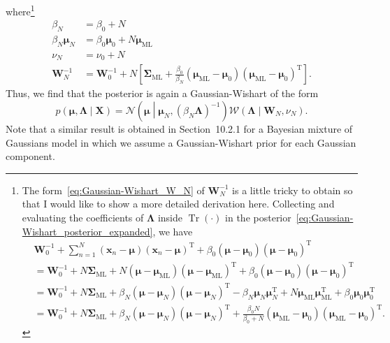 \documentclass[12pt,a4paper]{article}
\begin{document}
where\footnote{%
The form~\eqref{eq:Gaussian-Wishart_W_N} of $\mathbf{W}_N^{-1}$ is a little tricky to obtain
so that I would like to show a more detailed derivation here.
Collecting and evaluating the coefficients of $\bm{\Lambda}$ inside $\operatorname{Tr}(\cdot)$
in the posterior~\eqref{eq:Gaussian-Wishart_posterior_expanded},
we have
\begin{align}
&
\mathbf{W}_0^{-1} +
\sum_{n=1}^{N}
\left(\mathbf{x}_n - \bm{\mu}\right)
\left(\mathbf{x}_n - \bm{\mu}\right)^{\operatorname{T}} +
\beta_0\left(\bm{\mu} - \bm{\mu}_0\right)\left(\bm{\mu} - \bm{\mu}_0\right)^{\operatorname{T}}
\\
&=
\mathbf{W}_0^{-1} +
N \bm{\Sigma}_{\text{ML}} +
N \left(\bm{\mu} - \bm{\mu}_{\text{ML}}\right)
\left(\bm{\mu} - \bm{\mu}_{\text{ML}}\right)^{\operatorname{T}} +
\beta_0\left(\bm{\mu} - \bm{\mu}_0\right)\left(\bm{\mu} - \bm{\mu}_0\right)^{\operatorname{T}}
\\
&=
\mathbf{W}_0^{-1} +
N \bm{\Sigma}_{\text{ML}} +
\beta_N
\left(\bm{\mu} - \bm{\mu}_N\right)
\left(\bm{\mu} - \bm{\mu}_N\right)^{\operatorname{T}}
- \beta_N \bm{\mu}_N \bm{\mu}_N^{\operatorname{T}}
+ N \bm{\mu}_{\text{ML}} \bm{\mu}_{\text{ML}}^{\operatorname{T}}
+ \beta_0 \bm{\mu}_0 \bm{\mu}_0^{\operatorname{T}}
\\
&=
\mathbf{W}_0^{-1} +
N \bm{\Sigma}_{\text{ML}} +
\beta_N
\left(\bm{\mu} - \bm{\mu}_N\right)
\left(\bm{\mu} - \bm{\mu}_N\right)^{\operatorname{T}} +
\frac{\beta_0 N}{\beta_0 + N}
\left(\bm{\mu}_{\text{ML}} - \bm{\mu}_0\right)
\left(\bm{\mu}_{\text{ML}} - \bm{\mu}_0\right)^{\operatorname{T}} .
\end{align}
}
\begin{align}
\beta_N &= \beta_0 + N \\
\beta_N\bm{\mu}_N &= \beta_0\bm{\mu}_0 + N\bm{\mu}_{\text{ML}} \\
\nu_N &= \nu_0 + N \\
\mathbf{W}_{N}^{-1} &= \mathbf{W}_{0}^{-1} +
N \left[
\bm{\Sigma}_{\text{ML}} +
\frac{\beta_0}{\beta_N}
\left(\bm{\mu}_{\text{ML}} - \bm{\mu}_0\right)
\left(\bm{\mu}_{\text{ML}} - \bm{\mu}_0\right)^{\operatorname{T}}
\right] .
\label{eq:Gaussian-Wishart_W_N}
\end{align}
Thus, we find that the posterior is again a Gaussian-Wishart of the form
\begin{equation}
p\left(\bm{\mu}, \bm{\Lambda}\middle|\mathbf{X}\right) =
\mathcal{N}\left(\bm{\mu}\middle|\bm{\mu}_N, \left(\beta_N\bm{\Lambda}\right)^{-1}\right)
\mathcal{W}\left(\bm{\Lambda}\middle|\mathbf{W}_N, \nu_N\right) .
\end{equation}
Note that a similar result is obtained in Section~10.2.1 for a Bayesian mixture of Gaussians model
in which we assume a Gaussian-Wishart prior for each Gaussian component.
\end{document}
